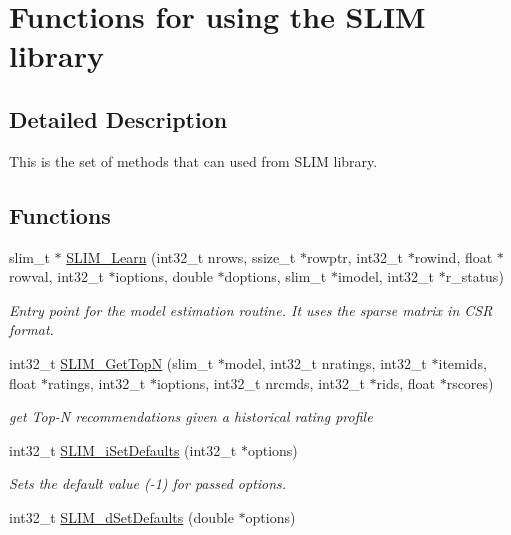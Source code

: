 \hypertarget{group__slimapi}{}\section{Functions for using the S\+L\+IM library}
\label{group__slimapi}


\subsection{Detailed Description}
This is the set of methods that can used from S\+L\+IM library. \subsection*{Functions}
\begin{DoxyCompactItemize}
\item 
slim\+\_\+t $\ast$ \hyperlink{group__slimapi_ga9c72d34ab6c2ba2b23d9d42ecee601ad}{S\+L\+I\+M\+\_\+\+Learn} (int32\+\_\+t nrows, ssize\+\_\+t $\ast$rowptr, int32\+\_\+t $\ast$rowind, float $\ast$rowval, int32\+\_\+t $\ast$ioptions, double $\ast$doptions, slim\+\_\+t $\ast$imodel, int32\+\_\+t $\ast$r\+\_\+status)
\begin{DoxyCompactList}\small\item\em Entry point for the model estimation routine. It uses the sparse matrix in C\+SR format. \end{DoxyCompactList}\item 
int32\+\_\+t \hyperlink{group__slimapi_gadfd1f913a1551b8368bb3fae0e822b11}{S\+L\+I\+M\+\_\+\+Get\+TopN} (slim\+\_\+t $\ast$model, int32\+\_\+t nratings, int32\+\_\+t $\ast$itemids, float $\ast$ratings, int32\+\_\+t $\ast$ioptions, int32\+\_\+t nrcmds, int32\+\_\+t $\ast$rids, float $\ast$rscores)
\begin{DoxyCompactList}\small\item\em get Top-\/N recommendations given a historical rating profile \end{DoxyCompactList}\item 
int32\+\_\+t \hyperlink{group__slimapi_ga1965cf3d8e4bb9dadbbea1d833f14cea}{S\+L\+I\+M\+\_\+i\+Set\+Defaults} (int32\+\_\+t $\ast$options)
\begin{DoxyCompactList}\small\item\em Sets the default value (-\/1) for passed options. \end{DoxyCompactList}\item 
int32\+\_\+t \hyperlink{group__slimapi_gabc2c211b672d060de71e4806b873608c}{S\+L\+I\+M\+\_\+d\+Set\+Defaults} (double $\ast$options)

\end{DoxyCompactItemize}
